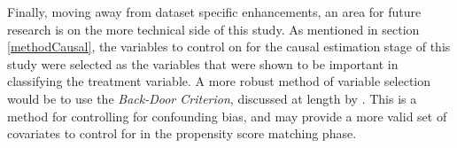 {Finally, moving away from dataset specific enhancements, an area for future research is on the more technical side of this study. As mentioned in section \ref{methodCausal}, the variables to control on for the causal estimation stage of this study were selected as the variables that were shown to be important in classifying the treatment variable. A more robust method of variable selection would be to use the {\it Back-Door Criterion}, discussed at length by \cite{pearl2009causality}. This is a method for controlling for confounding bias, and may provide a more valid set of covariates to control for in the propensity score matching phase. }